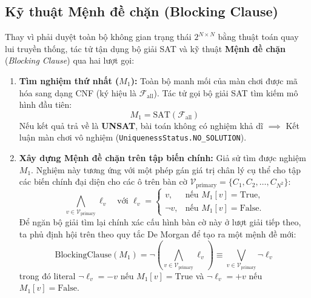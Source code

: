 \subsection{Kỹ thuật Mệnh đề chặn (Blocking Clause)}
Thay vì phải duyệt toàn bộ không gian trạng thái $2^{N \times N}$ bằng thuật toán quay lui truyền thống, tác tử tận dụng bộ giải SAT và kỹ thuật \textbf{Mệnh đề chặn} (\textit{Blocking Clause}) qua hai lượt gọi:

\begin{enumerate}
    \item \textbf{Tìm nghiệm thứ nhất ($M_1$):}
    Toàn bộ manh mối của màn chơi được mã hóa sang dạng CNF (ký hiệu là $\mathcal{F}_{\text{all}}$). Tác tử gọi bộ giải SAT tìm kiếm mô hình đầu tiên:
    \begin{equation}
        M_1 = \text{SAT}(\mathcal{F}_{\text{all}})
    \end{equation}
    Nếu kết quả trả về là \textbf{UNSAT}, bài toán không có nghiệm khả dĩ $\implies$ Kết luận màn chơi vô nghiệm (\texttt{UniquenessStatus.NO\_SOLUTION}).
    
    \item \textbf{Xây dựng Mệnh đề chặn trên tập biến chính:}
    Giả sử tìm được nghiệm $M_1$. Nghiệm này tương ứng với một phép gán giá trị chân lý cụ thể cho tập các biến chính đại diện cho các ô trên bàn cờ $\mathcal{V}_{\text{primary}} = \{C_1, C_2, \dots, C_{N^2}\}$:
    \begin{equation}
        \bigwedge_{v \in \mathcal{V}_{\text{primary}}} \ell_v \quad \text{với } \ell_v = 
        \begin{cases}
            v, & \text{nếu } M_1[v] = \text{True}, \\
            \neg v, & \text{nếu } M_1[v] = \text{False}.
        \end{cases}
    \end{equation}
    Để ngăn bộ giải tìm lại chính xác cấu hình bàn cờ này ở lượt giải tiếp theo, ta phủ định hội trên theo quy tắc De Morgan để tạo ra một mệnh đề mới:
    \begin{equation}
        \text{BlockingClause}(M_1) = \neg \left( \bigwedge_{v \in \mathcal{V}_{\text{primary}}} \ell_v \right) \equiv \bigvee_{v \in \mathcal{V}_{\text{primary}}} \neg \ell_v
    \end{equation}
    trong đó literal $\neg \ell_v = -v$ nếu $M_1[v] = \text{True}$ và $\neg \ell_v = +v$ nếu $M_1[v] = \text{False}$.
    

\end{enumerate}
